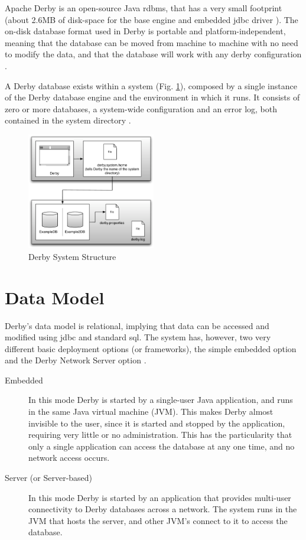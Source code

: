 Apache Derby is an open-source Java \ac{rdbms}, that has a very small footprint (about 2.6MB of disk-space for the base engine and embedded \ac{jdbc} driver \cite{derbySite}). The on-disk database format used in Derby is portable and platform-independent, meaning that the database can be moved from machine to machine with no need to modify the data, and that the database will work with any derby configuration \cite{derby10}. 

A Derby database exists within a system (Fig. \ref{fig:derbystruct}), composed by a single instance of the Derby database engine and the environment in which it runs. It consists of zero or more databases, a system-wide configuration and an error log, both contained in the system directory \cite{derbyDev10}.

\begin{figure}[htb]
  \begin{center}
    \leavevmode
    \includegraphics[width=0.5\textwidth]{images/derbystruct}
  \end{center}
  \caption{Derby System Structure}
  \label{fig:derbystruct}
\end{figure}

\section{Data Model}
Derby's data model is relational, implying that data can be accessed and modified using \ac{jdbc} and standard \ac{sql}. The system has, however, two very different basic deployment options (or frameworks), the simple embedded option and the Derby Network Server option \cite{derby10}. 

\begin{description}
	\item[Embedded] In this mode Derby is started by a single-user Java application, and runs in the same Java virtual machine (JVM). This makes Derby almost invisible to the user, since it is started and stopped by the application, requiring very little or no administration. This has the particularity that only a single application can access the database at any one time, and no network access occurs. 
	\item[Server (or Server-based)] In this mode Derby is started by an application that provides multi-user connectivity to Derby databases across a network. The system runs in the JVM that hosts the server, and other JVM's connect to it to access the database.
\end{description}	

